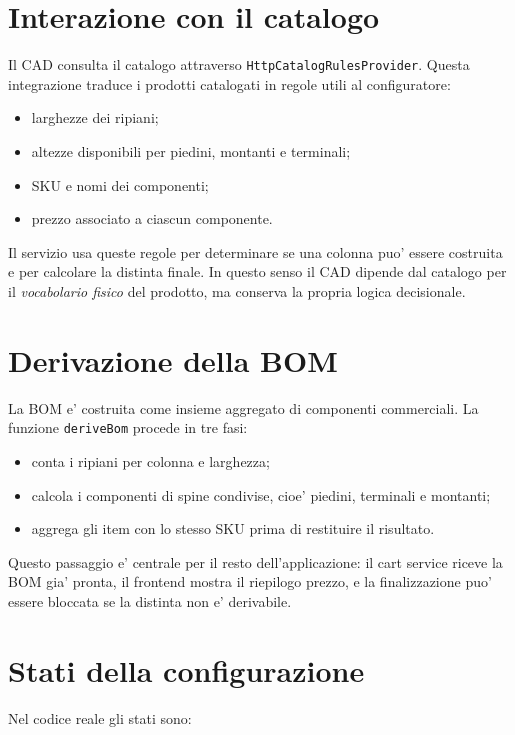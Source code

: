 \section{Interazione con il catalogo}

Il CAD consulta il catalogo attraverso \texttt{HttpCatalogRulesProvider}. Questa integrazione traduce i prodotti catalogati in regole utili al configuratore:

\begin{itemize}
\item larghezze dei ripiani;
\item altezze disponibili per piedini, montanti e terminali;
\item SKU e nomi dei componenti;
\item prezzo associato a ciascun componente.
\end{itemize}

Il servizio usa queste regole per determinare se una colonna puo' essere costruita e per calcolare la distinta finale. In questo senso il CAD dipende dal catalogo per il \emph{vocabolario fisico} del prodotto, ma conserva la propria logica decisionale.

\section{Derivazione della BOM}

La BOM e' costruita come insieme aggregato di componenti commerciali. La funzione \texttt{deriveBom} procede in tre fasi:

\begin{itemize}
\item conta i ripiani per colonna e larghezza;
\item calcola i componenti di spine condivise, cioe' piedini, terminali e montanti;
\item aggrega gli item con lo stesso SKU prima di restituire il risultato.
\end{itemize}

Questo passaggio e' centrale per il resto dell'applicazione: il cart service riceve la BOM gia' pronta, il frontend mostra il riepilogo prezzo, e la finalizzazione puo' essere bloccata se la distinta non e' derivabile.

\section{Stati della configurazione}

Nel codice reale gli stati sono:

